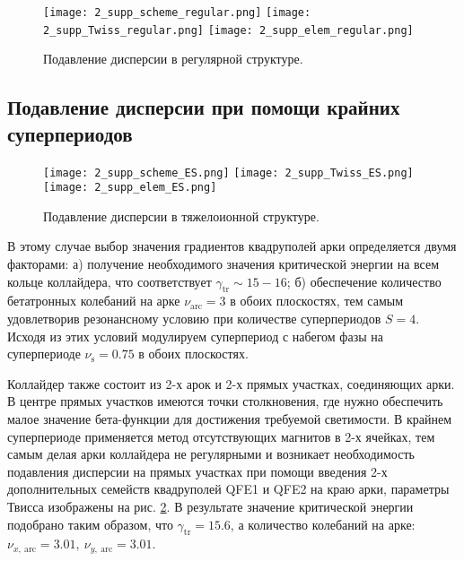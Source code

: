 \begin{figure} [h!]
   \center
   \texttt{[image: 2\_supp\_scheme\_regular.png]}
   \texttt{[image: 2\_supp\_Twiss\_regular.png]}
   \texttt{[image: 2\_supp\_elem\_regular.png]}
   \caption{Подавление дисперсии в регулярной структуре.}
   \label{fig:2_disp_supp_full_regular}
\end{figure}
	
\subsection{Подавление дисперсии при помощи крайних суперпериодов}\label{subsec:transition_variation/disp_supperssion/ES}

\par	
\begin{figure} [h!]
   \center
   \texttt{[image: 2\_supp\_scheme\_ES.png]}
   \texttt{[image: 2\_supp\_Twiss\_ES.png]}
   \texttt{[image: 2\_supp\_elem\_ES.png]}
   \caption{Подавление дисперсии в тяжелоионной структуре.}
   \label{fig:2_disp_supp_ES}
\end{figure}		

\par В этому случае выбор значения градиентов квадруполей арки определяется двумя факторами:
	а) получение необходимого значения критической энергии на всем кольце коллайдера, что соответствует $\gamma_{\text{tr}}\sim15-16$;
	б) обеспечение количество бетатронных колебаний на арке $\nu_{\text{arc}}=3$ в обоих плоскостях, тем самым удовлетворив резонансному условию при количестве суперпериодов $S=4$. Исходя из этих условий модулируем суперпериод с набегом фазы на суперпериоде $\nu_{\text{s}}=0.75$ в обоих плоскостях.

\par Коллайдер также состоит из 2-х арок и 2-х прямых участках, соединяющих арки. В центре прямых участков имеются точки столкновения, где нужно обеспечить малое значение бета-функции для достижения требуемой светимости. В крайнем суперпериоде применяется метод отсутствующих магнитов в 2-х ячейках, тем самым делая арки коллайдера не регулярными и возникает необходимость подавления дисперсии на прямых участках при помощи введения 2-х дополнительных семейств квадруполей QFE1 и QFE2 на краю арки, параметры Твисса изображены на рис. \ref{fig:2_disp_supp_ES}. В результате значение критической энергии подобрано таким образом, что $\gamma_{\text{tr}}=15.6$, а количество колебаний на арке: $\nu_{x,\ \text{arc}}=3.01,\ \nu_{y,\ \text{arc}}=3.01$.

